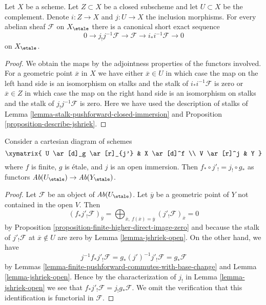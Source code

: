 \begin{lemma}
\label{lemma-ses-associated-to-open}
Let $X$ be a scheme. Let $Z \subset X$ be a closed subscheme and let
$U \subset X$ be the complement. Denote $i : Z \to X$ and $j : U \to X$
the inclusion morphisms. For every abelian sheaf $\mathcal{F}$ on $X_\etale$
there is a canonical short exact sequence
$$
0 \to j_!j^{-1}\mathcal{F} \to \mathcal{F} \to i_*i^{-1}\mathcal{F} \to 0
$$
on $X_\etale$.
\end{lemma}

\begin{proof}
We obtain the maps by the adjointness properties of the functors
involved. For a geometric point $\overline{x}$ in $X$ we have either
$\overline{x} \in U$ in which case the map on the left hand side
is an isomorphism on stalks and the stalk of $i_*i^{-1}\mathcal{F}$
is zero or $\overline{x} \in Z$ in which case the map on the right hand side
is an isomorphism on stalks and the stalk of $j_!j^{-1}\mathcal{F}$
is zero. Here we have used the description of stalks of
Lemma \ref{lemma-stalk-pushforward-closed-immersion} and
Proposition \ref{proposition-describe-jshriek}.
\end{proof}

\begin{lemma}
\label{lemma-compatible-shriek-push-finite}
Consider a cartesian diagram of schemes
$$
\xymatrix{
U \ar[d]_g \ar[r]_{j'} & X \ar[d]^f \\
V \ar[r]^j & Y
}
$$
where $f$ is finite, $g$ is \'etale, and $j$ is an open immersion.
Then $f_* \circ j'_! = j_! \circ g_*$ as functors
$\textit{Ab}(U_\etale) \to \textit{Ab}(Y_\etale)$.
\end{lemma}

\begin{proof}
Let $\mathcal{F}$ be an object of $\textit{Ab}(U_\etale)$.
Let $\overline{y}$ be a geometric point of $Y$ not contained
in the open $V$. Then
$$
(f_*j'_!\mathcal{F})_{\overline{y}} =
\bigoplus\nolimits_{\overline{x},\ f(\overline{x}) = \overline{y}}
(j'_!\mathcal{F})_{\overline{x}} = 0
$$
by Proposition \ref{proposition-finite-higher-direct-image-zero} and
because the stalk of $j'_!\mathcal{F}$ at $\overline{x} \not \in U$
are zero by Lemma \ref{lemma-jshriek-open}. On the other hand, we have
$$
j^{-1}f_*j'_!\mathcal{F} =
g_*(j')^{-1}j'_!\mathcal{F} =
g_*\mathcal{F}
$$
by Lemmas \ref{lemma-finite-pushforward-commutes-with-base-change} and
Lemma \ref{lemma-jshriek-open}.
Hence by the characterization of
$j_!$ in Lemma \ref{lemma-jshriek-open} we see that
$f_*j'_!\mathcal{F} = j_!g_*\mathcal{F}$.
We omit the verification that this identification
is functorial in $\mathcal{F}$.
\end{proof}








